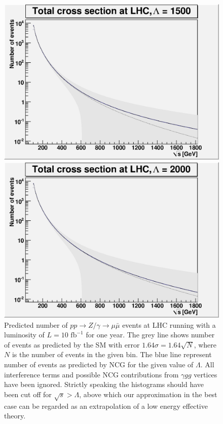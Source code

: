 \begin{figure}[h!tp]
\begin{minipage}[b]{0.475\linewidth}
	  \includegraphics[scale=0.35]{./images/L1500r139.eps}
	\end{minipage}
	\begin{minipage}[b]{0.475\linewidth}
    \centering
	  \includegraphics[scale=0.35]{./images/L2000r139.eps}
	\end{minipage}
		\caption{Predicted number of $pp \rightarrow Z/ \gamma \rightarrow \mu \bar \mu$ events at LHC running with a luminosity of $L=10 \textrm{ fb}^{-1}$ for one year. The grey line shows number of events as predicted by the SM with error $1.64\sigma = 1.64\sqrt{N}$, where $N$ is the number of events in the given bin. The blue line represent number of events as predicted by NCG for the given value of $\Lambda$. All interference terms and possible NCG contributions from $\gamma gg$ vertices have been ignored. Strictly speaking the histograms should have been cut off for $\sqrt{s} > \Lambda$, above which our approximation in the best case can be regarded as an extrapolation of a low energy effective theory.} \label{fig:lambdaplot}
\end{figure}

